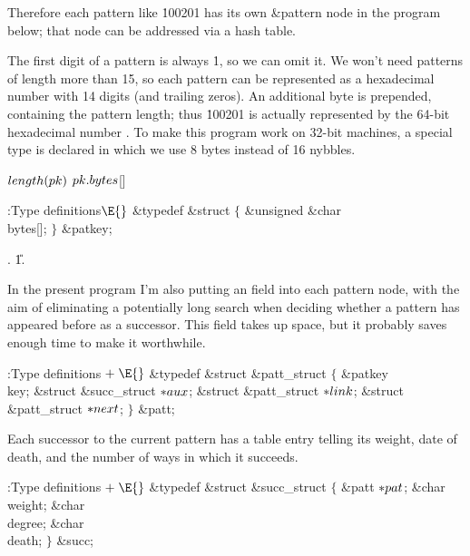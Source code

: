 Therefore each pattern like \.{100201} has its own \&{pattern} node in the
program below; that node can be addressed via a hash table.

The first digit of a pattern is always \.1, so we can omit it. We won't need
patterns of length more than 15, so each pattern can be represented as
a hexadecimal number with 14 digits (and trailing zeros). An additional
byte is prepended, containing the pattern length;
thus \.{100201} is actually represented by the 64-bit hexadecimal number
. To make this program work on 32-bit machines,
a special type is declared in which we use 8 bytes instead of 16 nybbles.

\Y\B\4\D$\\{length}(\\{pk})$ \5
$\\{pk}.\\{bytes}{}$[]\par
\Y\B\4:Type definitions\X${}\E{}$\6
\&{typedef} \&{struct} ${}\{{}$\1\6
\&{unsigned} \&{char} \\{bytes}[];\2\6
${}\}{}$ \&{patkey};\par
{}.
\U1.\fi

In the present program I'm also putting an  field into each
pattern
node, with the aim of eliminating a potentially long search when deciding
whether a pattern has appeared before as a successor. This field takes
up space, but it probably saves enough time to make it worthwhile.

\Y\B\4:Type definitions\X${}\mathrel+\E{}$\6
\&{typedef} \&{struct} \&{patt\_struct} ${}\{{}$\1\6
\&{patkey} \\{key};\6
\&{struct} \&{succ\_struct} ${}{*}\\{aux}{}$;%
\6
\&{struct} \&{patt\_struct} ${}{*}\\{link}{}$;\6
\&{struct} \&{patt\_struct} ${}{*}\\{next}{}$;\2\6
${}\}{}$ \&{patt};\par
\fi

Each successor to the current pattern
has a table entry telling its weight, date of death,
and the number of ways in which it succeeds.

\Y\B\4:Type definitions\X${}\mathrel+\E{}$\6
\&{typedef} \&{struct} \&{succ\_struct} ${}\{{}$\1\6
\&{patt} ${}{*}\\{pat}{}$;\6
\&{char} \\{weight};\6
\&{char} \\{degree};\6
\&{char} \\{death};\2\6
${}\}{}$ \&{succ};\par
\fi

